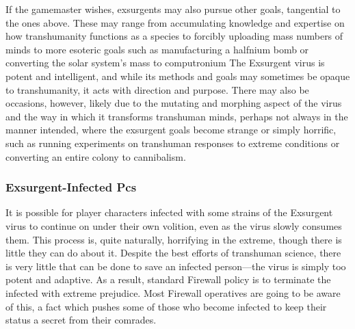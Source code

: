If the gamemaster wishes, exsurgents may also 
pursue other goals, tangential to the ones above. 
These may range from accumulating knowledge and 
expertise on how transhumanity functions as a species
to forcibly uploading mass numbers of minds to
more esoteric goals such as manufacturing a halfnium 
bomb or converting the solar system's mass to computronium
The Exsurgent virus is potent and intelligent,
and while its methods and goals may sometimes be 
opaque to transhumanity, it acts with direction and 
purpose. There may also be occasions, however, likely 
due to the mutating and morphing aspect of the virus 
and the way in which it transforms transhuman 
minds, perhaps not always in the manner intended, 
where the exsurgent goals become strange or simply 
horrific, such as running experiments on transhuman 
responses to extreme conditions or converting an 
entire colony to cannibalism.

\subsubsection{Exsurgent-Infected Pcs}

It is possible for player characters infected with some 
strains of the Exsurgent virus to continue on under 
their own volition, even as the virus slowly consumes 
them. This process is, quite naturally, horrifying in the 
extreme, though there is little they can do about it. 
Despite the best efforts of transhuman science, there 
is very little that can be done to save an infected 
person—the virus is simply too potent and adaptive. 
As a result, standard Firewall policy is to terminate 
the infected with extreme prejudice. Most Firewall 
operatives are going to be aware of this, a fact which 
pushes some of those who become infected to keep 
their status a secret from their comrades.

